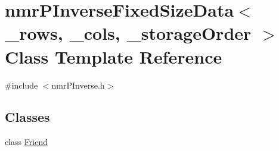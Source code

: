 \hypertarget{classnmr_p_inverse_fixed_size_data}{}\section{nmr\+P\+Inverse\+Fixed\+Size\+Data$<$ \+\_\+rows, \+\_\+cols, \+\_\+storage\+Order $>$ Class Template Reference}
\label{classnmr_p_inverse_fixed_size_data}


{\ttfamily \#include $<$nmr\+P\+Inverse.\+h$>$}

\subsection*{Classes}
\begin{DoxyCompactItemize}
\item 
class \hyperlink{classnmr_p_inverse_fixed_size_data_1_1_friend}{Friend}
\end{DoxyCompactItemize}
